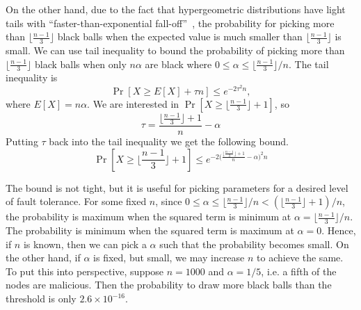 On the other hand, due to the fact that hypergeometric distributions have light tails with ``faster-than-exponential fall-off''~\cite{skala2013hypergeometric},
the probability for picking more than $\lfloor \frac{n-1}{3} \rfloor$ black balls when 
the expected value is much smaller than $\lfloor \frac{n-1}{3} \rfloor$ is small.
We can use tail inequality to bound the probability of picking more than $\lfloor \frac{n-1}{3} \rfloor$ black balls when only $n\alpha$ are black where $0 \le \alpha \le \lfloor \frac{n-1}{3} \rfloor / n$.
The tail inequality is
$$
\Pr[X \ge E[X] + \tau n] \le e^{-2\tau^2n},
$$
where $E[X] = n\alpha$.
We are interested in $\Pr[X \ge \lfloor \frac{n-1}{3} \rfloor + 1]$, so
$$
\tau = \frac{\lfloor \frac{n-1}{3} \rfloor + 1}{n} - \alpha
$$
Putting $\tau$ back into the tail inequality we get the following bound.
$$
\Pr[X \ge \lfloor \frac{n-1}{3} \rfloor + 1] \le e^{-2 \big(\frac{\lfloor  \frac{n - 1}{3} \rfloor + 1}{n} - \alpha \big)^2 n}
$$

The bound is not tight, but it is useful for picking parameters for a desired level of fault tolerance.
For some fixed $n$, since $0 \le \alpha \le \lfloor \frac{n-1}{3} \rfloor/n < (\lfloor  \frac{n - 1}{3} \rfloor + 1) / n$,
the probability is maximum when the squared term is minimum at $\alpha = \lfloor \frac{n-1}{3} \rfloor/n$.
The probability is minimum when the squared term is maximum at $\alpha = 0$.
Hence, if $n$ is known, then we can pick a $\alpha$ such that the probability becomes small.
On the other hand, if $\alpha$ is fixed, but small, we may increase $n$ to achieve the same.
To put this into perspective,
suppose $n = 1000$ and $\alpha = 1/5$, i.e. a fifth of the nodes are malicious.
Then the probability to draw more black balls than the threshold is only $2.6 \times 10^{-16}$.
